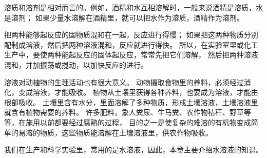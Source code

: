 溶质和溶剂是相对而言的。例如，酒精和水互相溶解时，一般来说酒精是溶质，水是溶剂；
如果少量水溶解在酒精里，就可以把水作为溶质，酒精作为溶剂。

把两种能够起反应的固物质混和在一起，反应进行得慢；
如果把这两种物质分别配制成溶液，然后把两种溶液混和，反应就进行得快。
所以，在实验室里或化工生产中，要使两种能起反应的固体起反应，常常先把它们溶解，
然后把两种溶液混和，并加振荡或搅动，以加快反应的进行。

溶液对动植物的生理活动也有很大意义。
动物摄取食物里的养料，必须经过消化，变成溶液，才能吸收。
植物从土壤里获得各种养料，也要成为溶液，才能由根部吸收。
土壤里含有水分，里面溶解了多种物质，形成土壤溶液，土壤溶液里就含有植物需要的养料。
许多肥料，象人粪尿、牛马粪、农作物秸秆、野草等等，在施用以前都要经过腐熟的过程，
目的之一是使复杂的难溶的有机物变成简单的易溶的物质，这些物质能溶解在土壤溶液里，供农作物吸收。

我们在生产和科学实验里，常用的是水溶液，因此，本章主要介绍水溶液的知识。


\begin{xiti}

\begin{xiaoxiaotis}

          
\end{xiaoxiaotis}


\begin{xiaoxiaotis}

          
\end{xiaoxiaotis}


\begin{xiaoxiaotis}



\end{xiaoxiaotis}



\end{xiti}


